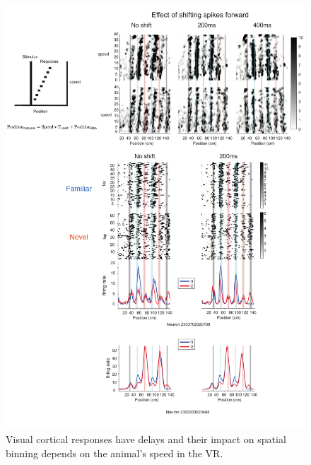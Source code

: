 \begin{figure}
    \centering
    \includegraphics[width=1\linewidth]{figures//Chapter 4 V1/fig2_speed_impact.pdf}
    \caption{Visual cortical responses have delays and their impact on spatial binning depends on the animal's speed in the VR. }
    \label{fig:placeholder}
\end{figure}


